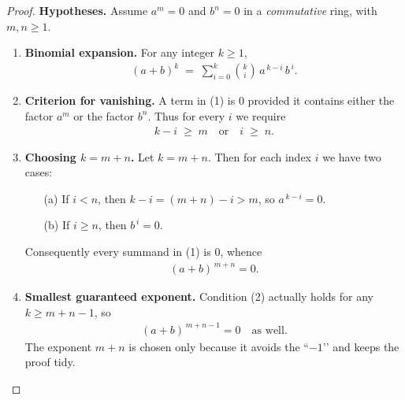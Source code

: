 \documentclass[12pt]{article}
\theoremstyle{definition} %
\theoremstyle{plain} %
\begin{document}
\begin{proof}
  \textbf{Hypotheses.}  Assume $a^{m}=0$ and $b^{n}=0$ in a \emph{commutative} ring,  
  with $m,n\ge 1$.
  
  \begin{enumerate}
    \item \textbf{Binomial expansion.}  
          For any integer $k\ge 1$,
          \begin{align}
            (a+b)^{k} \;=\; \sum_{i=0}^{k} \binom{k}{i}\,a^{\,k-i}\,b^{\,i}. \tag{1}
          \end{align}
  
    \item \textbf{Criterion for vanishing.}  
          A term in (1) is $0$ provided it contains either the factor $a^{m}$  
          or the factor $b^{n}$.  
          Thus for every $i$ we require
          \begin{align}
            k-i \;\ge\; m 
            \quad\text{or}\quad 
            i \;\ge\; n. \tag{2}
          \end{align}
  
    \item \textbf{Choosing $k=m+n$.}  
          Let $k=m+n$.  Then for each index $i$ we have two cases:
          \begin{enumerate}
            \item[(a)] If $i<n$, then $k-i=(m+n)-i>m$, so $a^{\,k-i}=0$.
            \item[(b)] If $i\ge n$, then $b^{\,i}=0$.
          \end{enumerate}
          Consequently every summand in (1) is $0$, whence
          \begin{align}
            (a+b)^{\,m+n}=0. \tag{3}
          \end{align}
  
    \item \textbf{Smallest guaranteed exponent.}  
          Condition (2) actually holds for any $k\ge m+n-1$, so
          \begin{align}
            (a+b)^{\,m+n-1}=0 \quad\text{as well}. \tag{4}
          \end{align}
          The exponent $m+n$ is chosen only because it avoids the “$-1$’’ and
          keeps the proof tidy.
  \end{enumerate}
  \end{proof}
\end{document}
